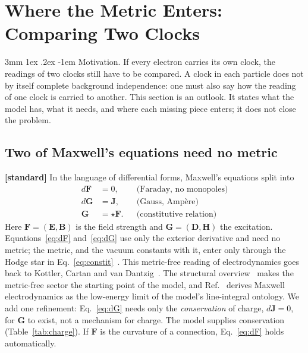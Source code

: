 \documentclass[%
 reprint, amsmath,amssymb, aps, prb, ]{revtex4-2}
\makeatletter
\numberwithin{equation}{section}
\renewcommand\paragraph{%
  \@startsection{paragraph}{4}{\z@}%
    {3mm \@plus 1ex \@minus .2ex}%
    {-1em}%
    {\normalfont\normalsize\itshape}}
\newcommand{\FF}{\mathbf{F}}
\newcommand{\hodge}{\star}
\makeatother
\begin{document}
\section{Where the Metric Enters: Comparing Two Clocks}
\label{sec:metric}

\paragraph{Motivation.} If every electron carries its own clock, the readings of two clocks still have to be compared. A clock in each particle does not by itself complete background independence: one must also say how the reading of one clock is carried to another. This section is an outlook. It states what the model has, what it needs, and where each missing piece enters; it does not close the problem.

\subsection{Two of Maxwell's equations need no metric}

\textbf{[standard]} In the language of differential forms, Maxwell's equations split into
\begin{align}
d\FF&=0, && \text{(Faraday, no monopoles)} \label{eq:dF}\\
d\mathbf{G}&=\mathbf{J}, && \text{(Gauss, Amp\`ere)} \label{eq:dG}\\
\mathbf{G}&=\hodge\FF. && \text{(constitutive relation)} \label{eq:constit}
\end{align}
Here $\FF=(\mathbf{E},\mathbf{B})$ is the field strength and $\mathbf{G}=(\mathbf{D},\mathbf{H})$ the excitation. Equations~\eqref{eq:dF} and~\eqref{eq:dG} use only the exterior derivative and need no metric; the metric, and the vacuum constants with it, enter only through the Hodge star in Eq.~\eqref{eq:constit}~\cite{ref:hehl}. This metric-free reading of electrodynamics goes back to Kottler, Cartan and van Dantzig~\cite{ref:kottler,ref:cartan23,ref:vandantzig}. The structural overview~\cite{ref:p67} makes the metric-free sector the starting point of the model, and Ref.~\cite{ref:p54} derives Maxwell electrodynamics as the low-energy limit of the model's line-integral ontology. We add one refinement: Eq.~\eqref{eq:dG} needs only the \emph{conservation} of charge, $d\mathbf{J}=0$, for $\mathbf{G}$ to exist, not a mechanism for charge. The model supplies conservation (Table~\ref{tab:charge}). If $\FF$ is the curvature of a connection, Eq.~\eqref{eq:dF} holds automatically.
\end{document}
